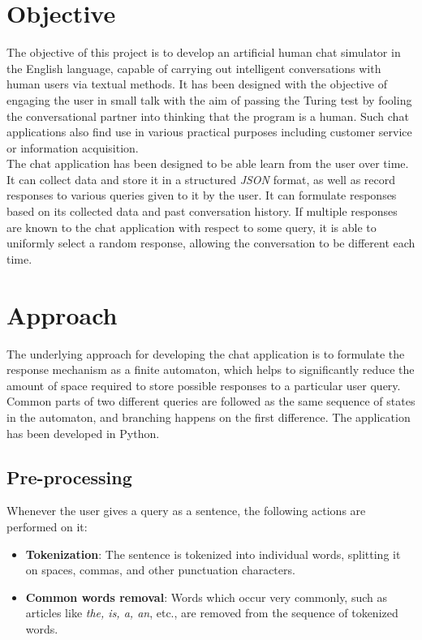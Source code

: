 \documentclass[12pt,a4paper]{article}
\begin{document}
\tableofcontents
\newpage

\section{Objective}
The objective of this project is to develop an artificial human chat simulator in the English language, capable of carrying out intelligent conversations with human users via textual methods. It has been designed with the objective of engaging the user in small talk with the aim of passing the Turing test by fooling the conversational partner into thinking that the program is a human. Such chat applications also find use in various practical purposes including customer service or information acquisition.\\

The chat application has been designed to be able learn from the user over time. It can collect data and store it in a structured \textit{JSON} format, as well as record responses to various queries given to it by the user. It can formulate responses based on its collected data and past conversation history. If multiple responses are known to the chat application with respect to some query, it is able to uniformly select a random response, allowing the conversation to be different each time.

\section{Approach}

The underlying approach for developing the chat application is to formulate the response mechanism as a finite automaton, which helps to significantly reduce the amount of space required to store possible responses to a particular user query. Common parts of two different queries are followed as the same sequence of states in the automaton, and branching happens on the first difference. The application has been developed in Python.

\subsection{Pre-processing}
Whenever the user gives a query as a sentence, the following actions are performed on it:

\begin{itemize}
\item \textbf{Tokenization}: The sentence is tokenized into individual words, splitting it on spaces, commas, and other punctuation characters.
\item \textbf{Common words removal}: Words which occur very commonly, such as articles like \textit{the, is,  a, an}, etc., are removed from the sequence of tokenized words.
\end{itemize}
\end{document}
